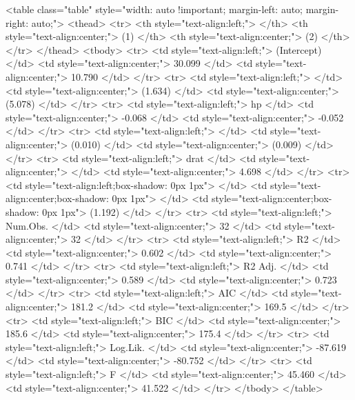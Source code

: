 <table class="table" style="width: auto !important; margin-left: auto; margin-right: auto;">
 <thead>
  <tr>
   <th style="text-align:left;">   </th>
   <th style="text-align:center;"> (1) </th>
   <th style="text-align:center;"> (2) </th>
  </tr>
 </thead>
<tbody>
  <tr>
   <td style="text-align:left;"> (Intercept) </td>
   <td style="text-align:center;"> 30.099 </td>
   <td style="text-align:center;"> 10.790 </td>
  </tr>
  <tr>
   <td style="text-align:left;">  </td>
   <td style="text-align:center;"> (1.634) </td>
   <td style="text-align:center;"> (5.078) </td>
  </tr>
  <tr>
   <td style="text-align:left;"> hp </td>
   <td style="text-align:center;"> -0.068 </td>
   <td style="text-align:center;"> -0.052 </td>
  </tr>
  <tr>
   <td style="text-align:left;">  </td>
   <td style="text-align:center;"> (0.010) </td>
   <td style="text-align:center;"> (0.009) </td>
  </tr>
  <tr>
   <td style="text-align:left;"> drat </td>
   <td style="text-align:center;">  </td>
   <td style="text-align:center;"> 4.698 </td>
  </tr>
  <tr>
   <td style="text-align:left;box-shadow: 0px 1px">  </td>
   <td style="text-align:center;box-shadow: 0px 1px">  </td>
   <td style="text-align:center;box-shadow: 0px 1px"> (1.192) </td>
  </tr>
  <tr>
   <td style="text-align:left;"> Num.Obs. </td>
   <td style="text-align:center;"> 32 </td>
   <td style="text-align:center;"> 32 </td>
  </tr>
  <tr>
   <td style="text-align:left;"> R2 </td>
   <td style="text-align:center;"> 0.602 </td>
   <td style="text-align:center;"> 0.741 </td>
  </tr>
  <tr>
   <td style="text-align:left;"> R2 Adj. </td>
   <td style="text-align:center;"> 0.589 </td>
   <td style="text-align:center;"> 0.723 </td>
  </tr>
  <tr>
   <td style="text-align:left;"> AIC </td>
   <td style="text-align:center;"> 181.2 </td>
   <td style="text-align:center;"> 169.5 </td>
  </tr>
  <tr>
   <td style="text-align:left;"> BIC </td>
   <td style="text-align:center;"> 185.6 </td>
   <td style="text-align:center;"> 175.4 </td>
  </tr>
  <tr>
   <td style="text-align:left;"> Log.Lik. </td>
   <td style="text-align:center;"> -87.619 </td>
   <td style="text-align:center;"> -80.752 </td>
  </tr>
  <tr>
   <td style="text-align:left;"> F </td>
   <td style="text-align:center;"> 45.460 </td>
   <td style="text-align:center;"> 41.522 </td>
  </tr>
</tbody>
</table>
